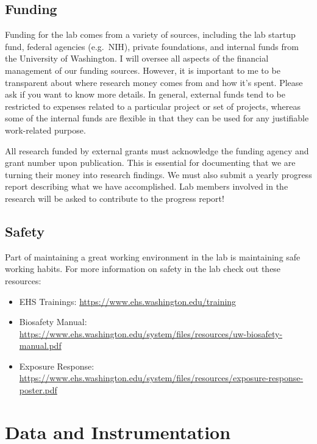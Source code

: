 \documentclass[
]{book}
\providecommand{\tightlist}{%
  \setlength{\itemsep}{0pt}\setlength{\parskip}{0pt}}
\begin{document}
\hypertarget{funding}{%
\section{Funding}\label{funding}}

Funding for the lab comes from a variety of sources, including the lab startup fund, federal agencies (e.g.~NIH), private foundations, and internal funds from the University of Washington. I will oversee all aspects of the financial management of our funding sources. However, it is important to me to be transparent about where research money comes from and how it's spent. Please ask if you want to know more details. In general, external funds tend to be restricted to expenses related to a particular project or set of projects, whereas some of the internal funds are flexible in that they can be used for any justifiable work-related purpose.

All research funded by external grants must acknowledge the funding agency and grant number upon publication. This is essential for documenting that we are turning their money into research findings. We must also submit a yearly progress report describing what we have accomplished. Lab members involved in the research will be asked to contribute to the progress report!

\hypertarget{safety}{%
\section{Safety}\label{safety}}

Part of maintaining a great working environment in the lab is maintaining safe working habits. For more information on safety in the lab check out these resources:

\begin{itemize}
\tightlist
\item
  EHS Trainings: \url{https://www.ehs.washington.edu/training}
\item
  Biosafety Manual: \url{https://www.ehs.washington.edu/system/files/resources/uw-biosafety-manual.pdf}
\item
  Exposure Response: \url{https://www.ehs.washington.edu/system/files/resources/exposure-response-poster.pdf}
\end{itemize}

\hypertarget{data}{%
\chapter{Data and Instrumentation}\label{data}}
\end{document}

